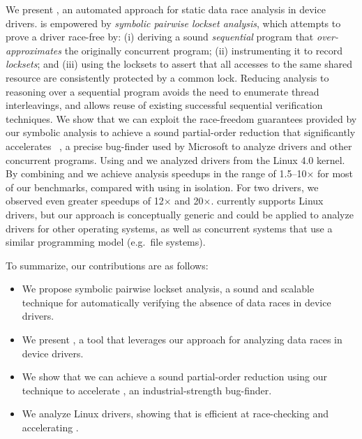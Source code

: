 We present \whoop, an automated approach for static data race analysis in device drivers. \whoop is empowered by \emph{symbolic pairwise lockset analysis}, which attempts to prove a driver race-free by: (i) deriving a sound \emph{sequential} program that \emph{over-approximates} the originally concurrent program; (ii) instrumenting it to record \emph{locksets}; and (iii) using the locksets to assert that all accesses to the same shared resource are consistently protected by a common lock. Reducing analysis to reasoning over a sequential program avoids the need to enumerate thread interleavings, and allows reuse of existing successful sequential verification techniques.
%
We show that we can exploit the race-freedom guarantees provided by our symbolic analysis to achieve a sound partial-order reduction that significantly accelerates \corral~\cite{lal2012corral}, a precise bug-finder used by Microsoft to analyze drivers and other concurrent programs. Using \whoop and \corral we analyzed \sizeOfBenchmarks drivers from the Linux 4.0 kernel.  By combining \whoop and \corral we achieve analysis speedups in the range of 1.5--10$\times$ for most of our benchmarks, compared with using \corral in isolation.  For two drivers, we observed even greater speedups of 12$\times$ and 20$\times$.
%
\whoop currently supports Linux drivers, but our approach is conceptually generic and could be applied to analyze drivers for other operating systems, as well as concurrent systems that use a similar programming model (e.g.\ file systems).

To summarize, our contributions are as follows:
\begin{itemize}
\item We propose symbolic pairwise lockset analysis, a sound and scalable technique for automatically verifying the absence of data races in device drivers.
\item We present \whoop, a tool that leverages our approach for analyzing data races in device drivers.
\item We show that we can achieve a sound partial-order reduction using our technique to accelerate \corral, an industrial-strength bug-finder.
\item We analyze \sizeOfBenchmarks Linux drivers, showing that \whoop is efficient at race-checking and accelerating \corral.
\end{itemize}
